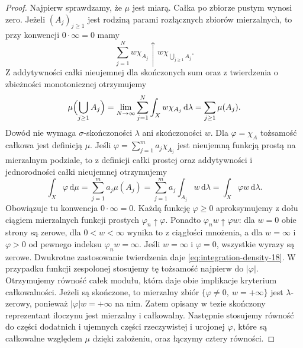 \begin{proof}
Najpierw sprawdzamy, że $\mu$ jest miarą. Całka
po zbiorze pustym wynosi zero. Jeżeli $(A_j)_{j\ge1}$
jest rodziną parami rozłącznych zbiorów mierzalnych, to
przy konwencji $0\cdot\infty=0$ mamy
\[
 \sum_{j=1}^{N}w\chi_{A_j}
 \uparrow w\chi_{\bigcup_{j\ge1}A_j}.
\]
Z addytywności całki nieujemnej dla skończonych sum
oraz z twierdzenia  o zbieżności
monotonicznej otrzymujemy
\[
 \mu\Bigl(\bigcup_{j\ge1}A_j\Bigr)
 =\lim_{N\to\infty}\sum_{j=1}^{N}
          \int_X w\chi_{A_j}\,\mathrm d\lambda
 =\sum_{j\ge1}\mu(A_j).
\]
Dowód nie wymaga $\sigma$-skończoności $\lambda$
ani skończoności $w$. Dla $\varphi=\chi_A$
tożsamość całkowa jest definicją $\mu$.
Jeśli $\varphi=\sum_{j=1}^m a_j\chi_{A_j}$ jest nieujemną
funkcją prostą na mierzalnym podziale, to z definicji
całki prostej oraz addytywności i jednorodności całki
nieujemnej otrzymujemy
\[
 \int_X\varphi\,\mathrm d\mu
 =\sum_{j=1}^m a_j\mu(A_j)
 =\sum_{j=1}^m a_j\int_{A_j}w\,\mathrm d\lambda
 =\int_X\varphi w\,\mathrm d\lambda.
\]
Obowiązuje tu konwencja $0\cdot\infty=0$. Każdą funkcję
$\varphi\ge0$ aproksymujemy z dołu ciągiem mierzalnych
funkcji prostych $\varphi_n\uparrow\varphi$.
Ponadto $\varphi_n w\uparrow\varphi w$: dla $w=0$ obie
strony są zerowe, dla $0<w<\infty$ wynika to z ciągłości
mnożenia, a dla $w=\infty$ i $\varphi>0$ od pewnego indeksu
$\varphi_n w=\infty$. Jeśli $w=\infty$ i $\varphi=0$, wszystkie
wyrazy są zerowe. Dwukrotne zastosowanie twierdzenia
daje \eqref{eq:integration-density-18}. W przypadku
funkcji zespolonej stosujemy tę tożsamość najpierw do $|\varphi|$.
Otrzymujemy równość całek modułu, która daje obie
implikacje kryterium całkowalności. Jeżeli są skończone,
to mierzalny zbiór $\{\varphi\ne0,\ w=+\infty\}$ jest
$\lambda$-zerowy, ponieważ $|\varphi|w=+\infty$ na nim.
Zatem opisany w tezie skończony reprezentant iloczynu
jest mierzalny i całkowalny. Następnie stosujemy równość do części
dodatnich i ujemnych części rzeczywistej i urojonej $\varphi$,
które są całkowalne względem $\mu$ dzięki założeniu, oraz łączymy cztery równości.
\end{proof}

